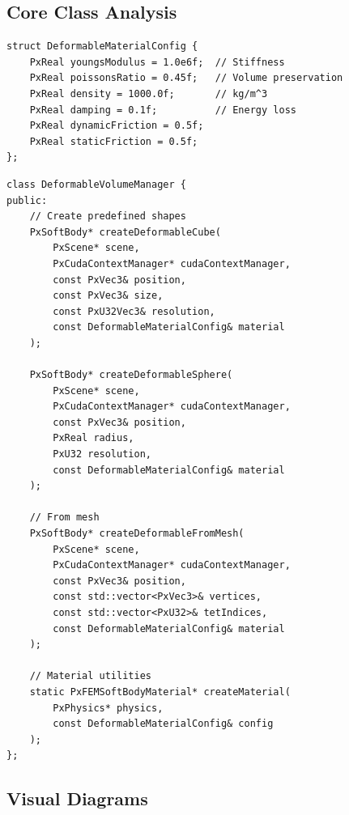 
\subsection{Core Class Analysis}

\begin{lstlisting}[caption={Deformable material config}]
struct DeformableMaterialConfig {
    PxReal youngsModulus = 1.0e6f;  // Stiffness
    PxReal poissonsRatio = 0.45f;   // Volume preservation
    PxReal density = 1000.0f;       // kg/m^3
    PxReal damping = 0.1f;          // Energy loss
    PxReal dynamicFriction = 0.5f;
    PxReal staticFriction = 0.5f;
};
\end{lstlisting}

\begin{lstlisting}[caption={DeformableVolumeManager API}]
class DeformableVolumeManager {
public:
    // Create predefined shapes
    PxSoftBody* createDeformableCube(
        PxScene* scene,
        PxCudaContextManager* cudaContextManager,
        const PxVec3& position,
        const PxVec3& size,
        const PxU32Vec3& resolution,
        const DeformableMaterialConfig& material
    );

    PxSoftBody* createDeformableSphere(
        PxScene* scene,
        PxCudaContextManager* cudaContextManager,
        const PxVec3& position,
        PxReal radius,
        PxU32 resolution,
        const DeformableMaterialConfig& material
    );

    // From mesh
    PxSoftBody* createDeformableFromMesh(
        PxScene* scene,
        PxCudaContextManager* cudaContextManager,
        const PxVec3& position,
        const std::vector<PxVec3>& vertices,
        const std::vector<PxU32>& tetIndices,
        const DeformableMaterialConfig& material
    );

    // Material utilities
    static PxFEMSoftBodyMaterial* createMaterial(
        PxPhysics* physics,
        const DeformableMaterialConfig& config
    );
};
\end{lstlisting}


\subsection{Visual Diagrams}

